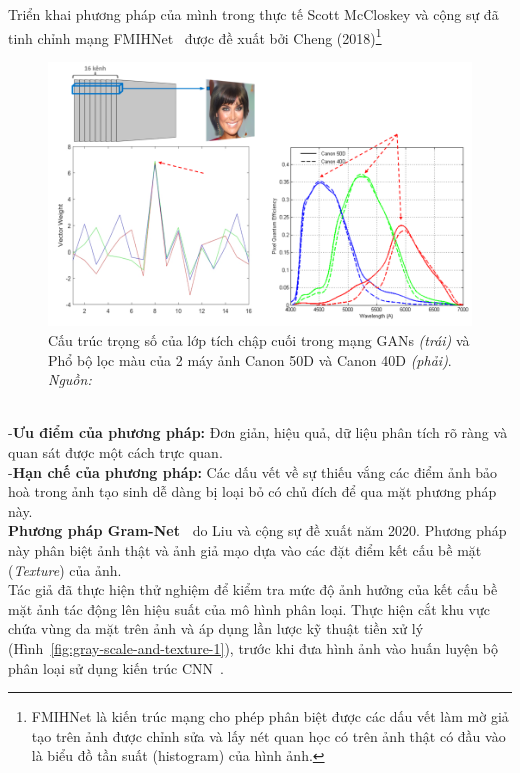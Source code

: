 %
Triển khai phương pháp của mình trong thực tế Scott McCloskey và cộng sự đã tinh chỉnh mạng FMIHNet~\cite{Chen2018FocusMD} được đề xuất bởi Cheng (2018)\footnote{FMIHNet là kiến trúc mạng cho phép phân biệt được các dấu vết làm mờ giả tạo trên ảnh được chỉnh sửa và lấy nét quan học có trên ảnh thật có đầu vào là biểu đồ tần suất (\gls{histogram}) của hình ảnh.}
%
\begin{figure}[htp]
	\centering
	\includegraphics[width=0.9\linewidth]{Images/colors-weight-gan-camera-1b.png}
	\begin{minipage}{0.9\linewidth}
		\caption{Cấu trúc trọng số của lớp tích chập cuối trong mạng GANs  \textit{(trái)} và Phổ bộ lọc màu của 2 máy ảnh Canon 50D và Canon 40D \textit{(phải)}. \textit{Nguồn: \cite{8803661}}}
		\label{fig:colors-weight-gan-camera-1b}
	\end{minipage}
\end{figure}\\
%
-\textbf{Ưu điểm của phương pháp:} Đơn giản, hiệu quả, dữ liệu phân tích rõ ràng và quan sát được một cách trực quan.\\
-\textbf{Hạn chế của phương pháp:} Các dấu vết về sự thiếu vắng các điểm ảnh bảo hoà trong ảnh tạo sinh dễ dàng bị loại bỏ có chủ đích để qua mặt phương pháp này.\\
%
\textbf{Phương pháp Gram-Net~\cite{9157447}} do Liu và cộng sự đề xuất năm 2020. Phương pháp này phân biệt ảnh thật và ảnh giả mạo dựa vào các đặt điểm kết cấu bề mặt (\textit{Texture}) của ảnh.\\
%
Tác giả đã thực hiện thử nghiệm để kiểm tra mức độ ảnh hưởng của kết cấu bề mặt ảnh tác động lên hiệu suất của mô hình phân loại. Thực hiện cắt khu vực chứa vùng da mặt trên ảnh và áp dụng lần lược kỹ thuật tiền xử lý (Hình~\ref{fig:gray-scale-and-texture-1}), trước khi đưa hình ảnh vào huấn luyện bộ phân loại sử dụng kiến trúc CNN~\cite{Krizhevsky2012ImageNetCW}.

